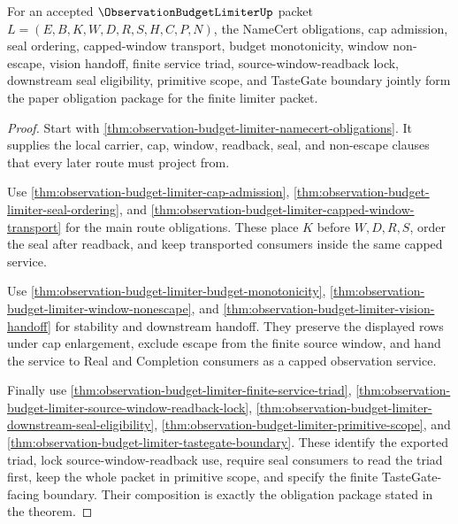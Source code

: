 \begin{theorem}
\label{thm:observation-budget-limiter-obligation-closure-package}
For an accepted $\ObservationBudgetLimiterUp$ packet $L=(E,B,K,W,D,R,S,H,C,P,N)$, the NameCert obligations, cap admission, seal ordering, capped-window transport, budget monotonicity, window non-escape, vision handoff, finite service triad, source-window-readback lock, downstream seal eligibility, primitive scope, and TasteGate boundary jointly form the paper obligation package for the finite limiter packet.
\end{theorem}
\begin{proof}
Start with \autoref{thm:observation-budget-limiter-namecert-obligations}. It supplies the local carrier, cap, window, readback, seal, and non-escape clauses that every later route must project from.

Use \autoref{thm:observation-budget-limiter-cap-admission}, \autoref{thm:observation-budget-limiter-seal-ordering}, and \autoref{thm:observation-budget-limiter-capped-window-transport} for the main route obligations. These place $K$ before $W,D,R,S$, order the seal after readback, and keep transported consumers inside the same capped service.

Use \autoref{thm:observation-budget-limiter-budget-monotonicity}, \autoref{thm:observation-budget-limiter-window-nonescape}, and \autoref{thm:observation-budget-limiter-vision-handoff} for stability and downstream handoff. They preserve the displayed rows under cap enlargement, exclude escape from the finite source window, and hand the service to Real and Completion consumers as a capped observation service.

Finally use \autoref{thm:observation-budget-limiter-finite-service-triad}, \autoref{thm:observation-budget-limiter-source-window-readback-lock}, \autoref{thm:observation-budget-limiter-downstream-seal-eligibility}, \autoref{thm:observation-budget-limiter-primitive-scope}, and \autoref{thm:observation-budget-limiter-tastegate-boundary}. These identify the exported triad, lock source-window-readback use, require seal consumers to read the triad first, keep the whole packet in primitive scope, and specify the finite TasteGate-facing boundary. Their composition is exactly the obligation package stated in the theorem.
\end{proof}

